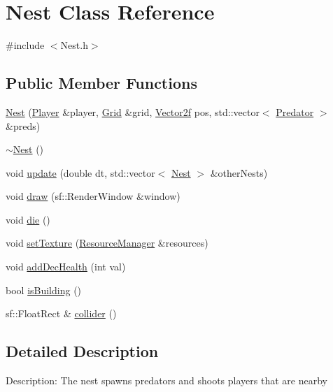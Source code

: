 \hypertarget{class_nest}{}\section{Nest Class Reference}
\label{class_nest}


{\ttfamily \#include $<$Nest.\+h$>$}

\subsection*{Public Member Functions}
\begin{DoxyCompactItemize}
\item 
\mbox{\hyperlink{class_nest_ab6ee6871ff8b0cd03443ae5c4925f3a6}{Nest}} (\mbox{\hyperlink{class_player}{Player}} \&player, \mbox{\hyperlink{class_grid}{Grid}} \&grid, \mbox{\hyperlink{class_vector2f}{Vector2f}} pos, std\+::vector$<$ \mbox{\hyperlink{class_predator}{Predator}} $>$ \&preds)
\item 
\mbox{\hyperlink{class_nest_a3e879ba15acd31717b1dc9bdc87488d5}{$\sim$\+Nest}} ()
\item 
void \mbox{\hyperlink{class_nest_adaff7cf66767b702b90b48aad3ac1e88}{update}} (double dt, std\+::vector$<$ \mbox{\hyperlink{class_nest}{Nest}} $>$ \&other\+Nests)
\item 
void \mbox{\hyperlink{class_nest_ac163aeb55369c46b551f6c415c2946c9}{draw}} (sf\+::\+Render\+Window \&window)
\item 
void \mbox{\hyperlink{class_nest_a168e5f70cab698039ea3ceb3ae979ca2}{die}} ()
\item 
void \mbox{\hyperlink{class_nest_abe5daf6621900c3be55e79a8390fff54}{set\+Texture}} (\mbox{\hyperlink{class_resource_manager}{Resource\+Manager}} \&resources)
\item 
void \mbox{\hyperlink{class_nest_aa27374891443c16bf480b1cda4edf2aa}{add\+Dec\+Health}} (int val)
\item 
bool \mbox{\hyperlink{class_nest_aa7382d9fa6b7f65bf94dc62d838b193c}{is\+Building}} ()
\item 
sf\+::\+Float\+Rect \& \mbox{\hyperlink{class_nest_a3388bd5cc2dc967a15d842e6c5f21760}{collider}} ()
\end{DoxyCompactItemize}


\subsection{Detailed Description}
Description\+: The nest spawns predators and shoots players that are nearby 

